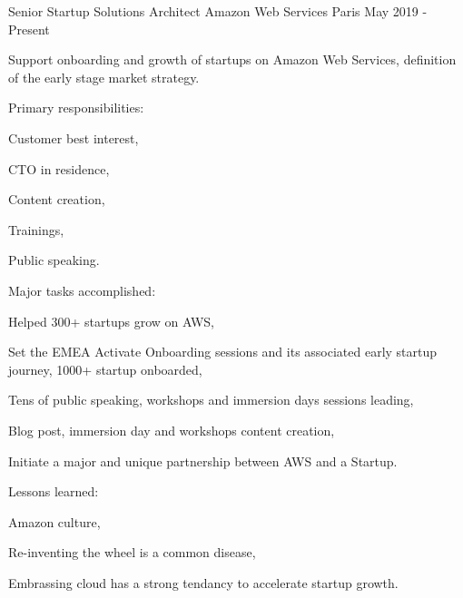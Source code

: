

\begin{cventries}

  \cventry
    {Senior Startup Solutions Architect} %
    {Amazon Web Services} %
    {Paris} %
    {May 2019 - Present} %
    {
      \begin{cvitems} %
        \item {Support onboarding and growth of startups on Amazon Web Services, definition of the early stage market strategy.}
        \item {Primary responsibilities:}
        \begin{cvsubitems}
          \item {Customer best interest,}
          \item {CTO in residence,}
          \item {Content creation,}
          \item {Trainings,}
          \item {Public speaking.}
        \end{cvsubitems}
        \item {Major tasks accomplished:}
        \begin{cvsubitems}
          \item {Helped 300+ startups grow on AWS,}
          \item {Set the EMEA Activate Onboarding sessions and its associated early startup journey, 1000+ startup onboarded,}
          \item {Tens of public speaking, workshops and immersion days sessions leading,}
          \item {Blog post, immersion day and workshops content creation,}
          \item {Initiate a major and unique partnership between AWS and a Startup.}
        \end{cvsubitems}
        \item {Lessons learned:}
        \begin{cvsubitems}
          \item {Amazon culture,}
          \item {Re-inventing the wheel is a common disease,}
          \item {Embrassing cloud has a strong tendancy to accelerate startup growth.}
        \end{cvsubitems}
      \end{cvitems}
    }


\end{cventries}
